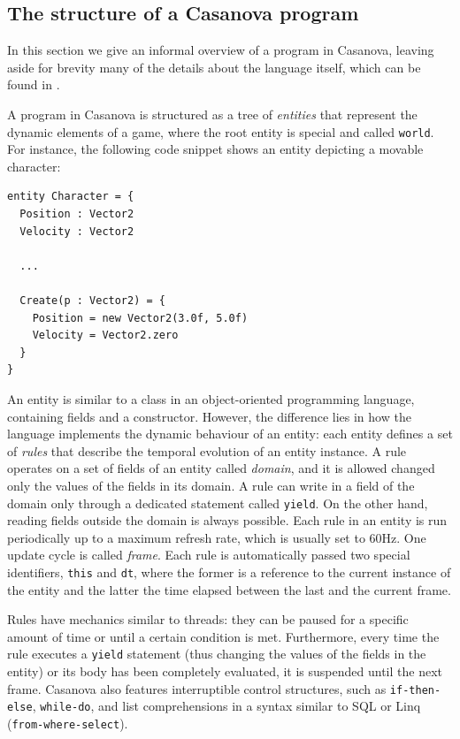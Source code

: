\subsection{The structure of a Casanova program}
In this section we give an informal overview of a program in Casanova, leaving aside for brevity many of the details about the language itself, which can be found in \cite{abbadi2014resource, abbadi2015casanova, abbadi2015high, abbadithesis2017}.

A program in Casanova is structured as a tree of \textit{entities} that represent the dynamic elements of a game, where the root entity is special and called \texttt{world}. For instance, the following code snippet shows an entity depicting a movable character:

\begin{lstlisting}
entity Character = {
  Position : Vector2
  Velocity : Vector2

  ...

  Create(p : Vector2) = {
    Position = new Vector2(3.0f, 5.0f)
    Velocity = Vector2.zero
  }  
}
\end{lstlisting} 

An entity is similar to a class in an object-oriented programming language, containing fields and a constructor. However, the difference lies in how the language implements the dynamic behaviour of an entity: each entity defines a set of \textit{rules} that describe the temporal evolution of an entity instance. A rule operates on a set of fields of an entity called \textit{domain}, and it is allowed changed only the values of the fields in its domain. A rule can write in a field of the domain only through a dedicated statement called \texttt{yield}. On the other hand, reading fields outside the domain is always possible. Each rule in an entity is run periodically up to a maximum refresh rate, which is usually set to 60Hz. One update cycle is called \textit{frame}. Each rule is automatically passed two special identifiers, \texttt{this} and \texttt{dt}, where the former is a reference to the current instance of the entity and the latter the time elapsed between the last and the current frame.

Rules have mechanics similar to threads: they can be paused for a specific amount of time or until a certain condition is met. Furthermore, every time the rule executes a \texttt{yield} statement (thus changing the values of the fields in the entity) or its body has been completely evaluated, it is suspended until the next frame. Casanova also features interruptible control structures, such as \texttt{if-then-else}, \texttt{while-do}, and list comprehensions in a syntax similar to SQL or Linq (\texttt{from-where-select}).
 

